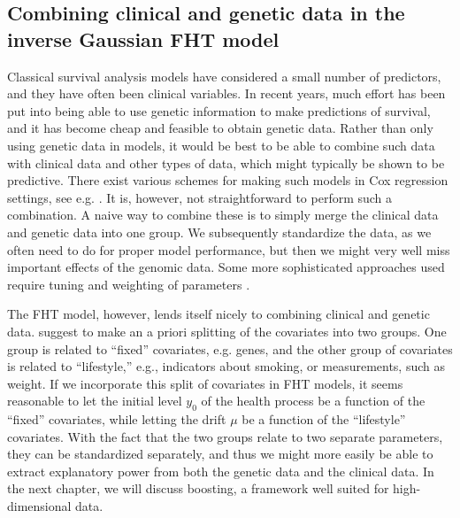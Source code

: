 

\subsection{Combining clinical and genetic data in the inverse Gaussian FHT model}
\label{subsec:FHT-combine}
Classical survival analysis models have considered a small number of predictors, and they have often been clinical variables.
In recent years, much effort has been put into being able to use genetic information to make predictions of survival, and it has become cheap and feasible to obtain genetic data.
Rather than only using genetic data in models, it would be best to be able to combine such data with clinical data and other types of data, which might typically be shown to be predictive.
There exist various schemes for making such models in Cox regression settings, see e.g. \citet{bovelstad2007}.
It is, however, not straightforward to perform such a combination.
A naive way to combine these is to simply merge the clinical data and genetic data into one group.
We subsequently standardize the data, as we often need to do for proper model performance, but then we might very well miss important effects of the genomic data.
Some more sophisticated approaches used require tuning and weighting of parameters \citep{sauerbrei}.

The FHT model, however, lends itself nicely to combining clinical and genetic data.
\citet{aalengjessing2001} suggest to make an a priori splitting of the covariates into two groups.
One group is related to ``fixed'' covariates, e.g. genes, and the other group of covariates is related to ``lifestyle,'' e.g., indicators about smoking, or measurements, such as weight.
If we incorporate this split of covariates in FHT models, it seems reasonable to let the initial level $y_0$ of the health process be a function of the ``fixed'' covariates, while letting the drift $\mu$ be a function of the ``lifestyle'' covariates.
With the fact that the two groups relate to two separate parameters, they can be standardized separately, and thus we might more easily be able to extract explanatory power from both the genetic data and the clinical data.
In the next chapter, we will discuss boosting, a framework well suited for high-dimensional data.